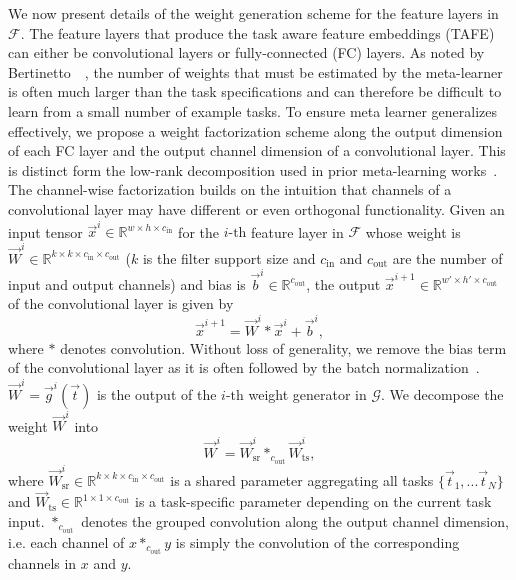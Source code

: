 \documentclass[10pt,twocolumn,letterpaper]{article}
\begin{document}
We now present details of the weight generation scheme for the feature layers in 
$\mathcal{F}$. 
The feature layers that produce the task aware feature embeddings (TAFE) can either be convolutional layers or fully-connected (FC) layers. 
As noted by Bertinetto~\etal~\cite{bertinetto2016learning}, the 
number of weights that must be estimated by the meta-learner is often much larger than the task specifications and can therefore be difficult to learn from a small number of example tasks.
To ensure meta learner generalizes effectively, we propose a weight 
factorization scheme along the output dimension of each FC layer and 
the output channel dimension of a convolutional layer.
This is distinct form the low-rank decomposition used in prior meta-learning works~\cite{bertinetto2016learning}. 
The channel-wise factorization builds on the intuition 
that channels of a convolutional layer
may have different or even orthogonal functionality. 
Given an input tensor $\Vec{x}^i\in \mathbb{R}^{w\times h\times c_\text{in}}$ for
the $i\text{-th}$ feature layer in $\mathcal{F}$ whose weight is $\Vec{W}^i \in\mathbb{R}^{k\times k\times c_\text{in}\times c_\text{out}}$ 
($k$ is the filter support size and $c_\text{in}$ and $c_\text{out}$ are 
the number of input and output channels) and bias is  $\Vec{b}^i\in\mathbb{R}^{c_\text{out}}$, the output $\Vec{x}^{i+1}\in \mathbb{R}^{w'\times h'\times c_\text{out}}$ of the convolutional layer is given
by 
\begin{equation}
    \Vec{x}^{i+1} = \Vec{W}^i * \Vec{x}^{i} + \Vec{b}^{i},
\end{equation}
where $*$ denotes convolution. Without loss of generality, we remove the bias term of the convolutional layer as it is often followed by the batch normalization~\cite{ioffe2015batch}. $\Vec{W}^i = \Vec{g}^i(\Vec{t})$ is
the output of the $i\text{-th}$ weight generator in $\mathcal{G}$.  
We decompose the 
weight $\Vec{W}^i$ into 
\begin{equation}
\Vec{W}^i=\Vec{W}^i_\text{sr} *_{c_{\text{out}}} \Vec{W}^i_\text{ts},
\end{equation}
where $\Vec{W}^i_\text{sr}\in\mathbb{R}^{k\times k \times c_\text{in}\times c_\text{out}}$ is a shared parameter aggregating all tasks $\{\Vec{t}_1, ...\Vec{t}_N\}$ and $\Vec{W}_\text{ts}\in\mathbb{R}^{1\times1\times c_\text{out}}$
is a task-specific parameter depending on the current task input.
$*_{c_\text{out}}$ denotes the grouped convolution along the output channel dimension,
i.e. each channel of $x*_{c_\text{out}} y$ is simply the convolution of the corresponding channels in $x$ and $y$. 
\end{document}
